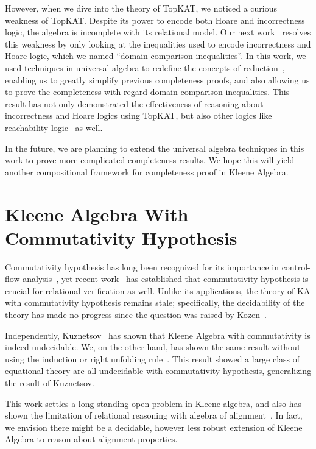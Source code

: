 \documentclass[11pt,a4paper,sans]{moderncv} %
\begin{document}
However, when we dive into the theory of TopKAT, we noticed a curious weakness of TopKAT. Despite its power to encode both Hoare and incorrectness logic, the algebra is incomplete with its relational model. Our next work~\cite{zhang_DomainReasoningTopKAT_2024} resolves this weakness by only looking at the inequalities used to encode incorrectness and Hoare logic, which we named ``domain-comparison inequalities''. 
In this work, we used techniques in universal algebra to redefine the concepts of reduction~\cite{pous_ToolsCompletenessKleene_2021,kozen_KleeneAlgebraTests_1997c}, enabling us to greatly simplify previous completeness proofs, and also allowing us to prove the completeness with regard domain-comparison inequalities. 
This result has not only demonstrated the effectiveness of reasoning about incorrectness and Hoare logics using TopKAT, but also other logics like reachability logic~\cite{naus_ReachabilityLogicLowLevel_2022a} as well.

In the future, we are planning to extend the universal algebra techniques in this work to prove more complicated completeness results. We hope this will yield another compositional framework for completeness proof in Kleene Algebra.

\newpage
\section{Kleene Algebra With Commutativity Hypothesis}

Commutativity hypothesis has long been recognized for its importance in control-flow analysis~\cite{kozen_KleeneAlgebraTests_1996}, yet recent work~\cite{antonopoulos_AlgebraAlignmentRelational_2023} has established that commutativity hypothesis is crucial for relational verification as well. 
Unlike its applications, the theory of KA with commutativity hypothesis remains stale; specifically, the decidability of the theory has made no progress since the question was raised by Kozen~\cite{kozen_KleeneAlgebraTests_1996}.

Independently, Kuznetsov~\cite{kuznetsov_ComplexityReasoningKleene_2023} has shown that Kleene Algebra with commutativity is indeed undecidable. We, on the other hand, has shown the same result without using the induction or right unfolding rule~\cite{azevedodeamorim_KleeneAlgebraCommutativity_2024}. 
This result showed a large class of equational theory are all undecidable with commutativity hypothesis, generalizing the result of Kuznetsov.

This work settles a long-standing open problem in Kleene algebra, and also has shown the limitation of relational reasoning with algebra of alignment~\cite{antonopoulos_AlgebraAlignmentRelational_2023}. In fact, we envision there might be a decidable, however less robust extension of Kleene Algebra to reason about alignment properties.
\end{document}
